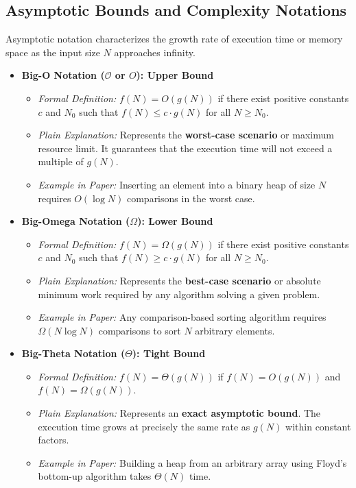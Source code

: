 \documentclass[10pt,journal,compsoc,onecolumn]{IEEEtran}
\begin{document}
\subsection{Asymptotic Bounds and Complexity Notations}

Asymptotic notation characterizes the growth rate of execution time or memory space as the input size $N$ approaches infinity.

\begin{itemize}
    \item \textbf{Big-O Notation ($\mathcal{O}$ or $O$): Upper Bound}
    \begin{itemize}
        \item \emph{Formal Definition:} $f(N) = O(g(N))$ if there exist positive constants $c$ and $N_0$ such that $f(N) \le c \cdot g(N)$ for all $N \ge N_0$.
        \item \emph{Plain Explanation:} Represents the \textbf{worst-case scenario} or maximum resource limit. It guarantees that the execution time will not exceed a multiple of $g(N)$.
        \item \emph{Example in Paper:} Inserting an element into a binary heap of size $N$ requires $O(\log N)$ comparisons in the worst case.
    \end{itemize}

    \item \textbf{Big-Omega Notation ($\Omega$): Lower Bound}
    \begin{itemize}
        \item \emph{Formal Definition:} $f(N) = \Omega(g(N))$ if there exist positive constants $c$ and $N_0$ such that $f(N) \ge c \cdot g(N)$ for all $N \ge N_0$.
        \item \emph{Plain Explanation:} Represents the \textbf{best-case scenario} or absolute minimum work required by any algorithm solving a given problem.
        \item \emph{Example in Paper:} Any comparison-based sorting algorithm requires $\Omega(N \log N)$ comparisons to sort $N$ arbitrary elements.
    \end{itemize}

    \item \textbf{Big-Theta Notation ($\Theta$): Tight Bound}
    \begin{itemize}
        \item \emph{Formal Definition:} $f(N) = \Theta(g(N))$ if $f(N) = O(g(N))$ and $f(N) = \Omega(g(N))$.
        \item \emph{Plain Explanation:} Represents an \textbf{exact asymptotic bound}. The execution time grows at precisely the same rate as $g(N)$ within constant factors.
        \item \emph{Example in Paper:} Building a heap from an arbitrary array using Floyd's bottom-up algorithm takes $\Theta(N)$ time.
    \end{itemize}
\end{itemize}
\end{document}

